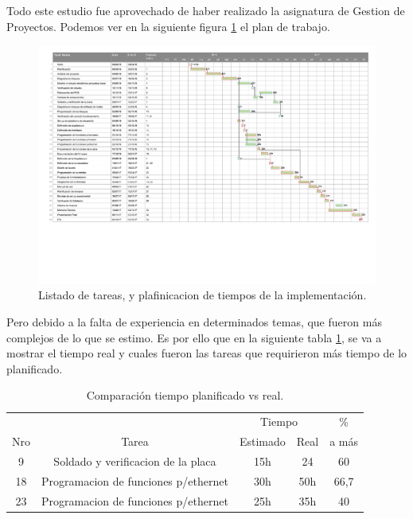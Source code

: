Todo este estudio fue aprovechado de haber realizado la asignatura de Gestion de Proyectos. Podemos ver en la siguiente figura \ref{fig:gantt} el plan de trabajo.

\begin{landscape}
  \pagestyle{empty}
  \begin{figure}[htb]
      \centering
          \includegraphics[page=1,clip, trim=0.5cm 5cm 0cm 0cm, width=1.70\textwidth]{./Figures/gantt.pdf}
      \caption{Listado de tareas, y plafinicacion de tiempos de la implementación.}
      \label{fig:gantt}
  \end{figure}
\end{landscape}


Pero debido a la falta de experiencia en determinados temas, que fueron más complejos de lo que se estimo. Es por ello que en la siguiente tabla \ref{tab:update_task}, se va a mostrar el tiempo real y cuales fueron las tareas que requirieron más tiempo de lo planificado.

\begin{table}[hp]
  \begin{tabular}{|c|c|c|c|c|}
    \hline
       &       & \multicolumn{2}{c|}{ Tiempo} & \%  \\ \cline{3-4}
    Nro& Tarea &  Estimado &  Real & a más \\
    \hline
    9 & Soldado y verificacion de la placa & 15h & 24 & 60 \\
    18 & Programacion de funciones p/ethernet & 30h & 50h & 66,7 \\
    23 & Programacion de funciones p/ethernet & 25h & 35h & 40 \\
    \hline \hline
  \end{tabular}
  \caption{Comparación tiempo planificado vs real.}
  \label{tab:update_task}
\end{table}

